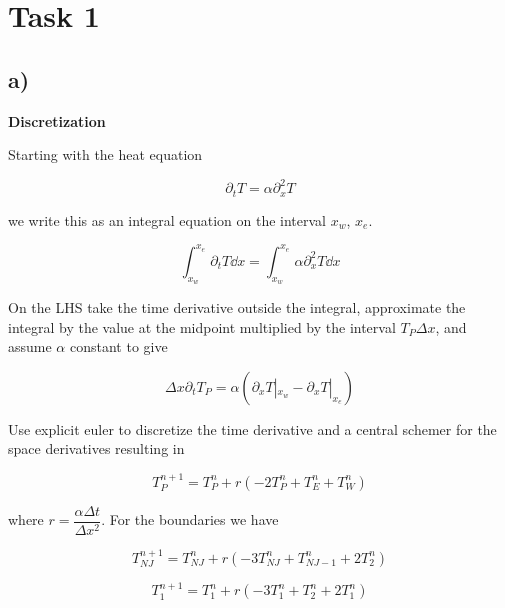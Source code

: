 \documentclass{article}
\begin{document}
\section{Task 1}

\subsection*{a)}

\textbf{Discretization}

Starting with the heat equation

\begin{equation}
	\partial_t T = \alpha \partial_x^2 T
\end{equation}

we write this as an integral equation on the interval $x_w$, $x_e$.

\begin{equation}
	\int_{x_w}^{x_e}  \partial_t T \dd{x} = \int_{x_w}^{x_e}  \alpha \partial_x^2 T \dd{x}
\end{equation}

On the LHS take the time derivative outside the integral, approximate the integral by the value at the midpoint multiplied by the interval $T_P \Delta x$, and assume $\alpha$ constant to give

\begin{equation}
 	\Delta x\partial_t T_P = \alpha (\partial_x T |_{x_w} - \partial_x T |_{x_e})
\end{equation}

Use explicit euler to discretize the time derivative and a central schemer for the space derivatives resulting in

\begin{equation}
	\label{eq:explicit}
 	T_P^{n+1} = T_P^n + r ( -2T_P^n + T_E^n + T_W^n)
\end{equation}

where $r = \dfrac{\alpha \Delta t }{\Delta x^2} $. For the boundaries we have 

\begin{equation}
 	T_{NJ}^{n+1} = T_{NJ}^n + r ( -3T_{NJ}^n + T_{NJ-1}^n + 2T_2^n)
\end{equation}

\begin{equation}
 	T_{1}^{n+1} = T_1^n + r ( -3T_{1}^n + T_{2}^n + 2T_1^n)
\end{equation}
\end{document}
